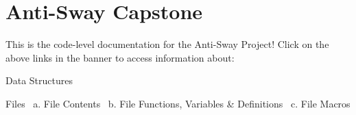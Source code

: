\chapter{Anti-\/\+Sway Capstone}
\hypertarget{index}{}\label{index}
This is the code-\/level documentation for the Anti-\/\+Sway Project! Click on the above links in the banner to access information about\+:
\begin{DoxyEnumerate}
\item Data Structures
\item Files~\newline
 a. File Contents~\newline
 b. File Functions, Variables \& Definitions~\newline
 c. File Macros  
\end{DoxyEnumerate}